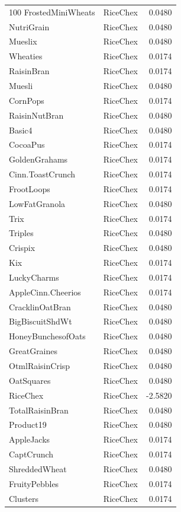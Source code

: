 \begin{longtable}{llr}
100%
FrostedMiniWheats & RiceChex & 0.0480 \\
NutriGrain & RiceChex & 0.0480 \\
Mueslix & RiceChex & 0.0480 \\
Wheaties & RiceChex & 0.0174 \\
RaisinBran & RiceChex & 0.0174 \\
Muesli & RiceChex & 0.0480 \\
CornPops & RiceChex & 0.0174 \\
RaisinNutBran & RiceChex & 0.0480 \\
Basic4 & RiceChex & 0.0480 \\
CocoaPus & RiceChex & 0.0174 \\
GoldenGrahams & RiceChex & 0.0174 \\
Cinn.ToastCrunch & RiceChex & 0.0174 \\
FrootLoops & RiceChex & 0.0174 \\
LowFatGranola & RiceChex & 0.0480 \\
Trix & RiceChex & 0.0174 \\
Triples & RiceChex & 0.0480 \\
Crispix & RiceChex & 0.0480 \\
Kix & RiceChex & 0.0174 \\
LuckyCharms & RiceChex & 0.0174 \\
AppleCinn.Cheerios & RiceChex & 0.0174 \\
CracklinOatBran & RiceChex & 0.0480 \\
BigBiscuitShdWt & RiceChex & 0.0480 \\
HoneyBunchesofOats & RiceChex & 0.0480 \\
GreatGraines & RiceChex & 0.0480 \\
OtmlRaisinCrisp & RiceChex & 0.0480 \\
OatSquares & RiceChex & 0.0480 \\
RiceChex & RiceChex & -2.5820 \\
TotalRaisinBran & RiceChex & 0.0480 \\
Product19 & RiceChex & 0.0480 \\
AppleJacks & RiceChex & 0.0174 \\
CaptCrunch & RiceChex & 0.0174 \\
ShreddedWheat & RiceChex & 0.0480 \\
FruityPebbles & RiceChex & 0.0174 \\
Clusters & RiceChex & 0.0174 \\

\end{longtable}
